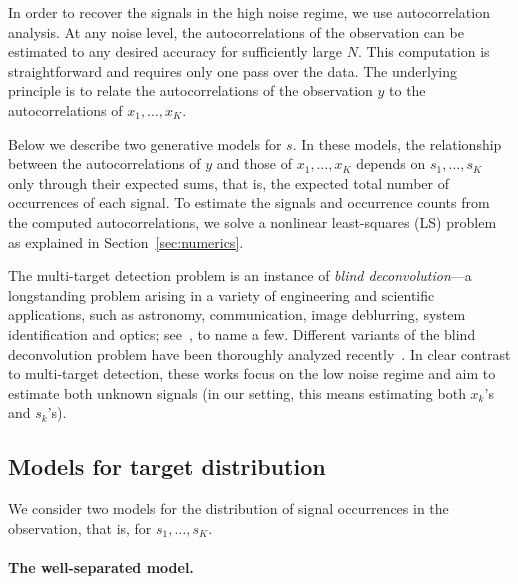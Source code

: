 \documentclass[12pt]{article}
\newcommand{\1}{\mathbf{1}}
\theoremstyle{plain}
\theoremstyle{definition}
\theoremstyle{remark}
\theoremstyle{plain}
\theoremstyle{remark}
\theoremstyle{plain}
\theoremstyle{plain}
\theoremstyle{plain}
\numberwithin{equation}{section}
\begin{document}
In order to recover the signals in the high noise regime, we use autocorrelation analysis.
At any noise level, the autocorrelations of the observation can be estimated to any desired accuracy for sufficiently large  $N$. 
This computation is straightforward and requires only one pass over the data.
The underlying principle is to relate the autocorrelations of the observation $y$ to the autocorrelations of $x_1,\ldots,x_K$.

Below we describe two generative models for $s$.  
In these models, the relationship between the autocorrelations of $y$ and those of $x_1,\ldots,x_K$ depends on $s_1,\ldots,s_K$ only through their expected sums, that is, the expected total number of occurrences of each signal.
To estimate the signals and occurrence counts from the computed autocorrelations, we solve a nonlinear least-squares (LS) problem as explained in Section~\ref{sec:numerics}. 

The multi-target detection problem  is an instance of  
\emph{blind deconvolution}---a longstanding problem arising in a variety of engineering and scientific applications, such as astronomy, communication, image deblurring, system identification and optics; see~\cite{jefferies1993restoration,shalvi1990new,ayers1988iterative,abed1997blind}, to name a few. 
Different variants of the blind deconvolution problem have been thoroughly analyzed recently~\cite{ahmed2014blind,li2016identifiability,li2016rapid,lee2017blind,ling2017blind,kuo2019geometry}. In clear contrast to multi-target detection, these works focus on the low noise regime and aim to estimate both unknown signals (in our setting, this means estimating both $x_k$'s and $s_k$'s).

\subsection*{Models for target distribution}

We consider two  models for the distribution of signal occurrences in the observation, that is, for $s_1, \ldots, s_K$.

\paragraph{The well-separated model.}
\end{document}
